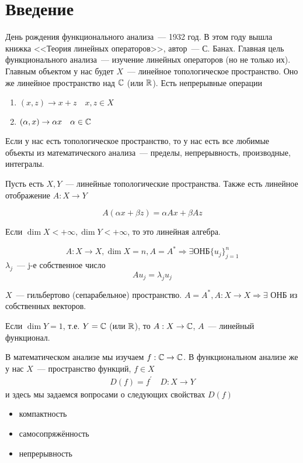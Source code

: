 \documentclass[document]{subfiles}
\begin{document}
\chapter{Введение}
День рождения функционального анализа~--- 1932 год. В этом году вышла книжка <<Теория линейных операторов>>, автор~--- С. Банах. Главная цель функционального анализа~--- изучение линейных операторов (но не только их). Главным объектом у нас будет $X$~--- линейное топологическое пространство. Оно же линейное пространство над $\mathbb{C}$ (или $\mathbb{R}$).
Есть непрерывные операции
\begin{enumerate}
    \item $(x,z) \rightarrow x + z \quad x,z \in X$
    \item $(\alpha,x) \rightarrow \alpha x \quad \alpha \in \mathbb{C}$
\end{enumerate}
Если у нас есть топологическое пространство, то у нас есть все любимые объекты из математического анализа~--- пределы, непрерывность, производные, интегралы.

Пусть есть $X,Y$~--- линейные топологические пространства. Также есть линейное отображение $A: X \rightarrow Y$
\begin{definition}
    \[ A(\alpha x + \beta z) = \alpha A x + \beta A z \]
\end{definition}

Если $\dim X < + \infty, \dim Y < + \infty$, то это линейная алгебра.

\[A: X \rightarrow X, \dim X = n, A = A^* \Rightarrow \exists \text {ОНБ} \{u_j\}_{j=1}^n \]
$\lambda_j$~--- j-е собственное число
\[ A u_j = \lambda_j u_j \]
\begin{theorem}[Гильберт]
    $X$~--- гильбертово (сепарабельное) пространство.
    $A = A^*, A: X \rightarrow X \Rightarrow \exists$ ОНБ из собственных векторов.
\end{theorem}

Если $\dim Y = 1$, т.е. $Y = \mathbb{C}$ (или $\mathbb{R}$), то $A: X \rightarrow \mathbb{C}$, $A$~--- линейный функционал.

В математическом анализе мы изучаем $f: \mathbb{C} \rightarrow \mathbb{C}$.
В функциональном анализе же у нас $X$~--- пространство функций, $f \in X$
\begin{gather}
    D(f) =  f^\prime \quad D: X \rightarrow Y
\end{gather}
и здесь мы задаемся вопросами о следующих свойствах $D(f)$
\begin{itemize}
    \item компактность
    \item самосопряжённость
    \item непрерывность
\end{itemize}
\end{document}
